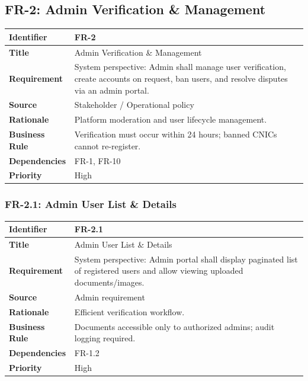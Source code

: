 \subsection{FR-2: Admin Verification \& Management}

\begin{longtable}{|p{3cm}|p{12cm}|}
\hline
\rowcolor{lightgray!30}
\textbf{Identifier} & FR-2 \\
\hline
\textbf{Title} & Admin Verification \& Management \\
\hline
\textbf{Requirement} & System perspective: Admin shall manage user verification, create accounts on request, ban users, and resolve disputes via an admin portal. \\
\hline
\textbf{Source} & Stakeholder / Operational policy \\
\hline
\textbf{Rationale} & Platform moderation and user lifecycle management. \\
\hline
\textbf{Business Rule} & Verification must occur within 24 hours; banned CNICs cannot re-register. \\
\hline
\textbf{Dependencies} & FR-1, FR-10 \\
\hline
\textbf{Priority} & High \\
\hline
\end{longtable}

\subsubsection{FR-2.1: Admin User List \& Details}

\begin{longtable}{|p{3cm}|p{12cm}|}
\hline
\rowcolor{lightgray!30}
\textbf{Identifier} & FR-2.1 \\
\hline
\textbf{Title} & Admin User List \& Details \\
\hline
\textbf{Requirement} & System perspective: Admin portal shall display paginated list of registered users and allow viewing uploaded documents/images. \\
\hline
\textbf{Source} & Admin requirement \\
\hline
\textbf{Rationale} & Efficient verification workflow. \\
\hline
\textbf{Business Rule} & Documents accessible only to authorized admins; audit logging required. \\
\hline
\textbf{Dependencies} & FR-1.2 \\
\hline
\textbf{Priority} & High \\
\hline
\end{longtable}

